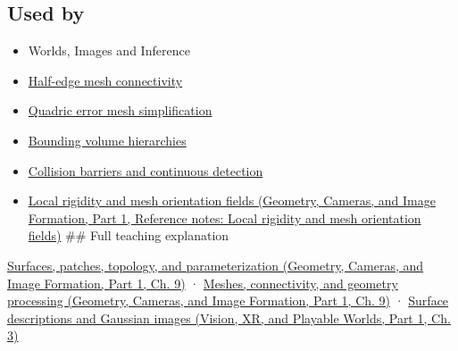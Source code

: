 \subsection{Used by}\label{appendix-fab348609369-used-by}

\hypertarget{appendix-fab348609369-used-by}{}

\begin{itemize}
\item
  {Worlds, Images and Inference}
\item
  \hyperref[appendix-1aea26b2307f]{Half-edge mesh connectivity}
\item
  \hyperref[appendix-1dd4ad54ca57]{Quadric error mesh simplification}
\item
  \hyperref[appendix-0b426c47dd78]{Bounding volume hierarchies}
\item
  \hyperref[appendix-a9ba01fa72a6]{Collision barriers and continuous detection}
\item
  \href{../03-Geometry-Cameras-and-Image-Formation-P01/main.pdf\#nameddest=appendix-7107009c505b}{Local rigidity and mesh orientation fields (Geometry, Cameras, and Image Formation, Part 1, Reference notes: Local rigidity and mesh orientation fields)} \#\# Full teaching explanation
\end{itemize}

\href{../03-Geometry-Cameras-and-Image-Formation-P01/main.pdf\#nameddest=03-visual-computing-i-ch002-surfaces-patches-topology-and-parameterization}{Surfaces, patches, topology, and parameterization (Geometry, Cameras, and Image Formation, Part 1, Ch. 9)} · \href{../03-Geometry-Cameras-and-Image-Formation-P01/main.pdf\#nameddest=03-visual-computing-i-ch002-meshes-connectivity-and-geometry-processing}{Meshes, connectivity, and geometry processing (Geometry, Cameras, and Image Formation, Part 1, Ch. 9)} · \href{../07-Vision-XR-and-Playable-Worlds-P01/main.pdf\#nameddest=04-visual-computing-ii-ch032-surface-descriptions-and-gaussian-images}{Surface descriptions and Gaussian images (Vision, XR, and Playable Worlds, Part 1, Ch. 3)}
